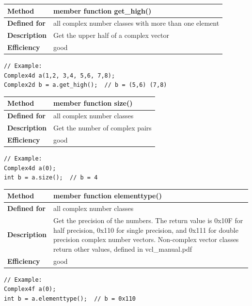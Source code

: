 \documentclass[11pt,a4paper,oneside,openright]{report}
\newcommand{\vspacesmall}{\vspace{3mm}}
\newcommand{\vspacebig}{\vspace{6mm}}
\begin{document}
\begin{tabular}{|p{25mm}|p{100mm}|}
\hline
\bfseries Method & member function get\_high() \\ \hline
\bfseries Defined for & all complex number classes with more than one element
 \\ \hline
\bfseries Description & Get the upper half of a complex vector \\ \hline
\bfseries Efficiency & good \\ \hline
\end{tabular}
\vspacesmall

\begin{lstlisting}[frame=none]
// Example:
Complex4d a(1,2, 3,4, 5,6, 7,8);
Complex2d b = a.get_high();  // b = (5,6) (7,8)
\end{lstlisting}
\vspacebig


\begin{tabular}{|p{25mm}|p{100mm}|}
\hline
\bfseries Method & member function size() \\ \hline
\bfseries Defined for & all complex number classes
 \\ \hline
\bfseries Description & Get the number of complex pairs \\ \hline
\bfseries Efficiency & good \\ \hline
\end{tabular}
\vspacesmall

\begin{lstlisting}[frame=none]
// Example:
Complex4d a(0);
int b = a.size();  // b = 4
\end{lstlisting}
\vspacebig


\begin{tabular}{|p{25mm}|p{100mm}|}
\hline
\bfseries Method & member function elementtype() \\ \hline
\bfseries Defined for & all complex number classes
 \\ \hline
\bfseries Description & Get the precision of the numbers. \newline
The return value is 0x10F for half precision, 0x110 for single precision, and 0x111 for double precision complex number vectors.
Non-complex vector classes return other values, defined in vcl\_manual.pdf \\ \hline
\bfseries Efficiency & good \\ \hline
\end{tabular}
\vspacesmall

\begin{lstlisting}[frame=none]
// Example:
Complex4f a(0);
int b = a.elementtype();  // b = 0x110
\end{lstlisting}
\vspacebig
\end{document}
